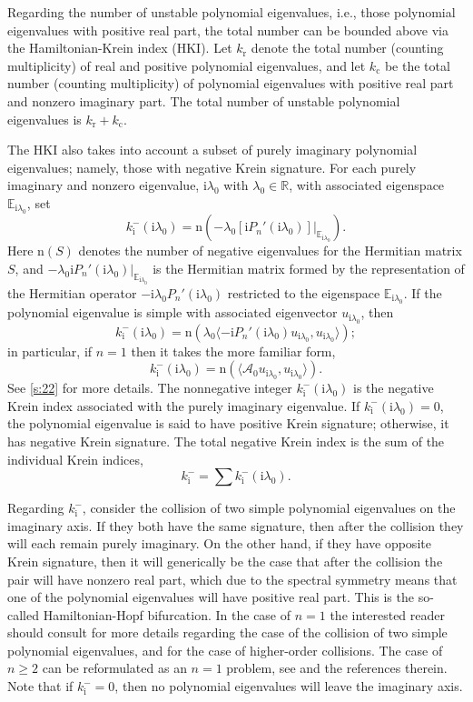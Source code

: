 \documentclass[review,onefignum,onetabnum]{siamart171218}
\newcommand{\E}{\mathbb{E}}
\newcommand{\R}{\mathbb{R}}
\newcommand{\rmc}{\mathrm{c}}
\newcommand{\rmi}{\mathrm{i}}
\newcommand{\rmn}{\mathrm{n}}
\newcommand{\rmr}{\mathrm{r}}
\newcommand{\calA}{\mathcal{A}}
\newcommand{\vS}{\bm{\mathit{S}}}
\begin{document}
Regarding the number of unstable polynomial eigenvalues, i.e., those
polynomial eigenvalues with positive real part, the total number can be
bounded above via the Hamiltonian-Krein index (HKI). Let $k_\rmr$ denote the
total number (counting multiplicity) of real and positive polynomial
eigenvalues, and let $k_\rmc$ be the total number (counting multiplicity) of
polynomial eigenvalues with positive real part and nonzero imaginary part.
The total number of unstable polynomial eigenvalues is $k_\rmr+k_\rmc$.

The HKI also takes into account a subset of purely imaginary polynomial
eigenvalues; namely, those with negative Krein signature. For each purely
imaginary and nonzero eigenvalue, $\rmi\lambda_0$ with $\lambda_0\in\R$, with
associated eigenspace $\E_{\rmi\lambda_0}$, set
\begin{equation}\label{e:defkrein}
k_\rmi^-(\rmi\lambda_0)=\rmn\left(-\lambda_0\left[\rmi P_n'(\rmi\lambda_0)\right]|_{\E_{\rmi\lambda_0}}\right).
\end{equation}
Here $\rmn(\vS)$ denotes the number of negative eigenvalues for the
Hermitian matrix $\vS$, and $-\lambda_0\rmi P_n'(\rmi\lambda_0)|_{\E_{\rmi\lambda_0}}$ is the Hermitian matrix
formed by the representation of the Hermitian operator
$-\rmi\lambda_0P_n'(\rmi\lambda_0)$ restricted to the eigenspace
$\E_{\rmi\lambda_0}$. If the polynomial eigenvalue is simple with associated
eigenvector $u_{\rmi\lambda_0}$, then
\[
k_\rmi^-(\rmi\lambda_0)=
\rmn\left(\lambda_0\langle-\rmi P_n'(\rmi\lambda_0)u_{\rmi\lambda_0},u_{\rmi\lambda_0}\rangle\right);
\]
in particular, if $n=1$ then it takes the more familiar form,
\[
k_\rmi^-(\rmi\lambda_0)=
\rmn\left(\langle\calA_0u_{\rmi\lambda_0},u_{\rmi\lambda_0}\rangle\right).
\]
See \cref{s:22} for more details.
The nonnegative integer $k_\rmi^-(\rmi\lambda_0)$ is the negative Krein index
associated with the purely imaginary eigenvalue. If
$k_\rmi^-(\rmi\lambda_0)=0$, the polynomial eigenvalue is said to have
positive Krein signature; otherwise, it has negative Krein signature. The
total negative Krein index is the sum of the individual Krein indices,
\[
k_\rmi^-=\sum k_\rmi^-(\rmi\lambda_0).
\]

Regarding $k_\rmi^-$, consider the
collision of two simple polynomial eigenvalues on the imaginary axis. If they both have the same
signature, then after the collision they will each remain purely imaginary.
On the other hand, if they have opposite Krein signature, then it will
generically be the case that after the collision the pair will have nonzero
real part, which due to the spectral symmetry means that one of the
polynomial eigenvalues will have positive real part. This is the so-called Hamiltonian-Hopf bifurcation. In the case of $n=1$ the interested reader
should consult \cite[Chapter~7.1]{kapitula:sad13} for more details regarding
the case of the collision of two simple polynomial  eigenvalues, and
\cite{kapitula:tks10,vougalter:eoz06} for the case of higher-order
collisions.
The case of $n\ge2$ can be reformulated as an $n=1$ problem, see \cite{kapitula:iif13} and the references therein.
Note that if $k_\rmi^-=0$, then no polynomial eigenvalues will leave the imaginary axis.
\end{document}
